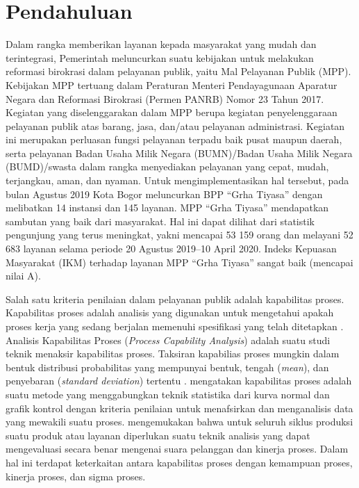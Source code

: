 \section{Pendahuluan}


Dalam rangka memberikan layanan kepada masyarakat yang mudah dan terintegrasi, Pemerintah meluncurkan suatu kebijakan untuk melakukan reformasi birokrasi dalam pelayanan publik, yaitu Mal Pelayanan Publik (MPP). Kebijakan MPP tertuang dalam Peraturan Menteri Pendayagunaan Aparatur Negara dan Reformasi Birokrasi (Permen PANRB) Nomor 23 Tahun 2017. Kegiatan yang diselenggarakan dalam MPP berupa kegiatan penyelenggaraan pelayanan publik atas barang, jasa, dan/atau pelayanan administrasi. Kegiatan ini merupakan perluasan fungsi pelayanan terpadu baik pusat maupun daerah, serta pelayanan Badan Usaha Milik Negara (BUMN)/Badan Usaha Milik Negara (BUMD)/swasta dalam rangka menyediakan pelayanan yang cepat, mudah, terjangkau, aman, dan nyaman. Untuk mengimplementasikan hal tersebut, pada bulan Agustus 2019 Kota Bogor meluncurkan BPP ``Grha Tiyasa'' dengan melibatkan 14 instansi dan 145 layanan. MPP ``Grha Tiyasa'' mendapatkan sambutan yang baik dari masyarakat. Hal ini dapat dilihat dari statistik pengunjung yang terus meningkat, yakni mencapai 53 159 orang dan melayani 52 683 layanan selama periode 20 Agustus 2019--10 April 2020. Indeks Kepuasan Masyarakat (IKM) terhadap layanan MPP ``Grha Tiyasa'' sangat baik (mencapai nilai A).

Salah satu kriteria penilaian dalam pelayanan publik adalah kapabilitas proses. Kapabilitas proses adalah analisis yang digunakan untuk mengetahui apakah proses kerja yang sedang berjalan memenuhi spesifikasi yang telah ditetapkan \cite{yuri2013tqm}. Analisis Kapabilitas Proses (\textit{Process Capability Analysis}) adalah suatu studi teknik menaksir kapabilitas proses. Taksiran kapabilias proses mungkin dalam bentuk distribusi probabilitas yang mempunyai bentuk, tengah (\textit{mean}), dan penyebaran (\textit{standard deviation}) tertentu \cite{pearn1992distributional, montgomery2009, mccormack2000capability, kotz2002process, wu2009overview}.  mengatakan kapabilitas proses adalah suatu metode yang menggabungkan teknik statistika dari kurva normal dan grafik kontrol dengan kriteria penilaian untuk menafsirkan dan menganalisis data yang mewakili suatu proses.  mengemukakan bahwa untuk seluruh siklus produksi suatu produk atau layanan diperlukan suatu teknik analisis yang dapat mengevaluasi secara benar mengenai suara pelanggan dan kinerja proses. Dalam hal ini terdapat keterkaitan antara kapabilitas proses dengan kemampuan proses, kinerja proses, dan sigma proses.

